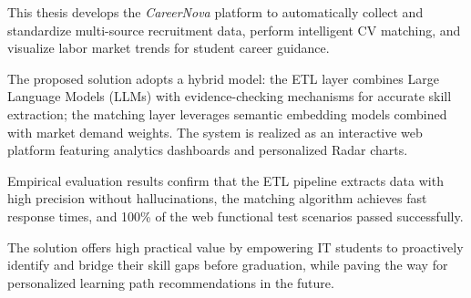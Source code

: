 This thesis develops the \textit{CareerNova} platform to automatically collect and standardize multi-source recruitment data, perform intelligent CV matching, and visualize labor market trends for student career guidance.

The proposed solution adopts a hybrid model: the ETL layer combines Large Language Models (LLMs) with evidence-checking mechanisms for accurate skill extraction; the matching layer leverages semantic embedding models combined with market demand weights. The system is realized as an interactive web platform featuring analytics dashboards and personalized Radar charts.

Empirical evaluation results confirm that the ETL pipeline extracts data with high precision without hallucinations, the matching algorithm achieves fast response times, and 100\% of the web functional test scenarios passed successfully.

The solution offers high practical value by empowering IT students to proactively identify and bridge their skill gaps before graduation, while paving the way for personalized learning path recommendations in the future.
